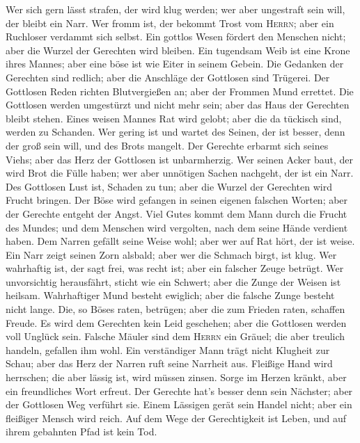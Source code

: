 Wer sich gern lässt strafen, der wird klug werden; wer
aber ungestraft sein will, der bleibt ein Narr.  Wer fromm
ist, der bekommt Trost vom \textsc{Herrn}; aber ein Ruchloser verdammt
sich selbst.  Ein gottlos Wesen fördert den Menschen
nicht; aber die Wurzel der Gerechten wird bleiben.  Ein
tugendsam Weib ist eine Krone ihres Mannes; aber eine böse ist wie Eiter
in seinem Gebein.  Die Gedanken der Gerechten sind
redlich; aber die Anschläge der Gottlosen sind Trügerei. 
Der Gottlosen Reden richten Blutvergießen an; aber der Frommen Mund
errettet.  Die Gottlosen werden umgestürzt und nicht mehr
sein; aber das Haus der Gerechten bleibt stehen.  Eines
weisen Mannes Rat wird gelobt; aber die da tückisch sind, werden zu
Schanden.  Wer gering ist und wartet des Seinen, der ist
besser, denn der groß sein will, und des Brots mangelt. 
Der Gerechte erbarmt sich seines Viehs; aber das Herz der Gottlosen ist
unbarmherzig.  Wer seinen Acker baut, der wird Brot die
Fülle haben; wer aber unnötigen Sachen nachgeht, der ist ein Narr.
 Des Gottlosen Lust ist, Schaden zu tun; aber die Wurzel
der Gerechten wird Frucht bringen.  Der Böse wird
gefangen in seinen eigenen falschen Worten; aber der Gerechte entgeht
der Angst.  Viel Gutes kommt dem Mann durch die Frucht
des Mundes; und dem Menschen wird vergolten, nach dem seine Hände
verdient haben.  Dem Narren gefällt seine Weise wohl;
aber wer auf Rat hört, der ist weise.  Ein Narr zeigt
seinen Zorn alsbald; aber wer die Schmach birgt, ist klug.
 Wer wahrhaftig ist, der sagt frei, was recht ist; aber
ein falscher Zeuge betrügt.  Wer unvorsichtig
herausfährt, sticht wie ein Schwert; aber die Zunge der Weisen ist
heilsam.  Wahrhaftiger Mund besteht ewiglich; aber die
falsche Zunge besteht nicht lange.  Die, so Böses raten,
betrügen; aber die zum Frieden raten, schaffen Freude. 
Es wird dem Gerechten kein Leid geschehen; aber die Gottlosen werden
voll Unglück sein.  Falsche Mäuler sind dem
\textsc{Herrn} ein Gräuel; die aber treulich handeln, gefallen ihm wohl.
 Ein verständiger Mann trägt nicht Klugheit zur Schau;
aber das Herz der Narren ruft seine Narrheit aus. 
Fleißige Hand wird herrschen; die aber lässig ist, wird müssen zinsen.
 Sorge im Herzen kränkt, aber ein freundliches Wort
erfreut.  Der Gerechte hat's besser denn sein Nächster;
aber der Gottlosen Weg verführt sie.  Einem Lässigen
gerät sein Handel nicht; aber ein fleißiger Mensch wird reich.
 Auf dem Wege der Gerechtigkeit ist Leben, und auf ihrem
gebahnten Pfad ist kein Tod.

